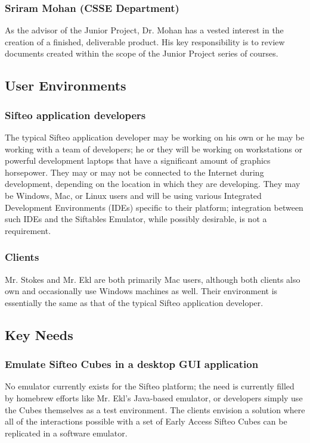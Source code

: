 \documentclass[12pt]{article}
\begin{document}
                          \subsubsection{Sriram Mohan (CSSE Department)}
                          As the advisor of the Junior Project, Dr. Mohan has a vested interest in the creation of a finished, deliverable product. His key responsibility is to review documents created within the scope of the Junior Project series of courses.

               \subsection{User Environments}

                          \subsubsection{Sifteo application developers}
                          The typical Sifteo application developer may be working on his own or he may be working with a team of developers; he or they will be working on workstations or powerful development laptops that have a significant amount of graphics horsepower. They may or may not be connected to the Internet during development, depending on the location in which they are developing. They may be Windows, Mac, or Linux users and will be using various Integrated Development Environments (IDEs) specific to their platform; integration between such IDEs and the Siftables Emulator, while possibly desirable, is not a requirement.

                          \subsubsection{Clients}
			  Mr. Stokes and Mr. Ekl are both primarily Mac users, although both clients also own and occasionally use Windows machines as well. Their environment is essentially the same as that of the typical Sifteo application developer.

               \subsection{Key Needs}

                          \subsubsection{Emulate Sifteo Cubes in a desktop GUI application}
                          No emulator currently exists for the Sifteo platform; the need is currently filled by homebrew efforts like Mr. Ekl’s Java-based emulator, or developers simply use the Cubes themselves as a test environment. The clients envision a solution where all of the interactions possible with a set of Early Access Sifteo Cubes can be replicated in a software emulator.
\end{document}
